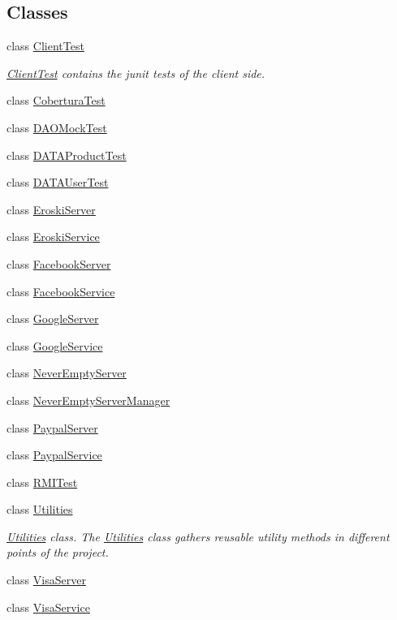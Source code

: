 \subsection*{Classes}
\begin{DoxyCompactItemize}
\item 
class \mbox{\hyperlink{class_s_p_q_1_1_client_test}{Client\+Test}}
\begin{DoxyCompactList}\small\item\em \mbox{\hyperlink{class_s_p_q_1_1_client_test}{Client\+Test}} contains the junit tests of the client side. \end{DoxyCompactList}\item 
class \mbox{\hyperlink{class_s_p_q_1_1_cobertura_test}{Cobertura\+Test}}
\item 
class \mbox{\hyperlink{class_s_p_q_1_1_d_a_o_mock_test}{D\+A\+O\+Mock\+Test}}
\item 
class \mbox{\hyperlink{class_s_p_q_1_1_d_a_t_a_product_test}{D\+A\+T\+A\+Product\+Test}}
\item 
class \mbox{\hyperlink{class_s_p_q_1_1_d_a_t_a_user_test}{D\+A\+T\+A\+User\+Test}}
\item 
class \mbox{\hyperlink{class_s_p_q_1_1_eroski_server}{Eroski\+Server}}
\item 
class \mbox{\hyperlink{class_s_p_q_1_1_eroski_service}{Eroski\+Service}}
\item 
class \mbox{\hyperlink{class_s_p_q_1_1_facebook_server}{Facebook\+Server}}
\item 
class \mbox{\hyperlink{class_s_p_q_1_1_facebook_service}{Facebook\+Service}}
\item 
class \mbox{\hyperlink{class_s_p_q_1_1_google_server}{Google\+Server}}
\item 
class \mbox{\hyperlink{class_s_p_q_1_1_google_service}{Google\+Service}}
\item 
class \mbox{\hyperlink{class_s_p_q_1_1_never_empty_server}{Never\+Empty\+Server}}
\item 
class \mbox{\hyperlink{class_s_p_q_1_1_never_empty_server_manager}{Never\+Empty\+Server\+Manager}}
\item 
class \mbox{\hyperlink{class_s_p_q_1_1_paypal_server}{Paypal\+Server}}
\item 
class \mbox{\hyperlink{class_s_p_q_1_1_paypal_service}{Paypal\+Service}}
\item 
class \mbox{\hyperlink{class_s_p_q_1_1_r_m_i_test}{R\+M\+I\+Test}}
\item 
class \mbox{\hyperlink{class_s_p_q_1_1_utilities}{Utilities}}
\begin{DoxyCompactList}\small\item\em \mbox{\hyperlink{class_s_p_q_1_1_utilities}{Utilities}} class. The \mbox{\hyperlink{class_s_p_q_1_1_utilities}{Utilities}} class gathers reusable utility methods in different points of the project. \end{DoxyCompactList}\item 
class \mbox{\hyperlink{class_s_p_q_1_1_visa_server}{Visa\+Server}}
\item 
class \mbox{\hyperlink{class_s_p_q_1_1_visa_service}{Visa\+Service}}
\end{DoxyCompactItemize}


